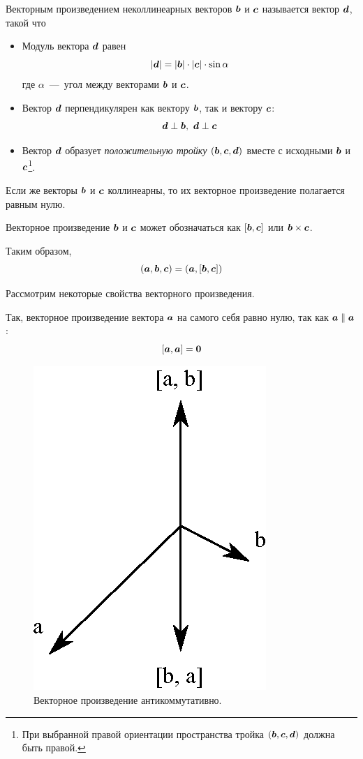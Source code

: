 \documentclass[a4paper,12pt]{article}
\begin{document}
  \begin{definition}
    Векторным произведением неколлинеарных векторов $\boldsymbol b$ и $\boldsymbol c$ называется вектор $\boldsymbol d$, такой что
    \begin{itemize}
      \item Модуль вектора $\boldsymbol d$ равен
      \[
        |\boldsymbol d| = |\boldsymbol b| \cdot |\boldsymbol c| \cdot \sin\alpha
      \]
      где $\alpha$~---~угол между векторами $\boldsymbol b$ и $\boldsymbol c$.
      
      \item Вектор $\boldsymbol d$ перпендикулярен как вектору $\boldsymbol b$, так и вектору $\boldsymbol c$:
      \[
        \boldsymbol d \perp \boldsymbol b,\ \boldsymbol d \perp \boldsymbol c
      \]
      
      \item Вектор $\boldsymbol d$ образует \emph{положительную тройку} $(\boldsymbol b, \boldsymbol c, \boldsymbol d)$ вместе с исходными $\boldsymbol b$ и $\boldsymbol c$\footnote{При выбранной правой ориентации пространства тройка $(\boldsymbol b, \boldsymbol c, \boldsymbol d)$ должна быть правой.}.
    \end{itemize}
    
    Если же векторы $\boldsymbol b$ и $\boldsymbol c$ коллинеарны, то их векторное произведение полагается равным нулю.
    
    Векторное произведение $\boldsymbol b$ и $\boldsymbol c$ может обозначаться как $[\boldsymbol b, \boldsymbol c]$ или $\bds b \hm\times \bds c$.
  \end{definition}
  
  Таким образом,
  \begin{equation}\label{eq:triple-as-scalar-and-vector}
    (\boldsymbol a, \boldsymbol b, \boldsymbol c) = (\boldsymbol a, [\boldsymbol b, \boldsymbol c])
  \end{equation}
  
  Рассмотрим некоторые свойства векторного произведения.
  
  Так, векторное произведение вектора $\boldsymbol a$ на самого себя равно нулю, так как $\bds a \hm\parallel \bds a$:
  \[
    [\boldsymbol a, \boldsymbol a] = \boldsymbol 0
  \]
  
  \begin{figure}[h]
    \centering
    
    \includegraphics[width=0.25\columnwidth]{ab-ba}
    
    \caption{Векторное произведение антикоммутативно.}
    \label{fig:ab-ba}
  \end{figure}
    
\end{document}

